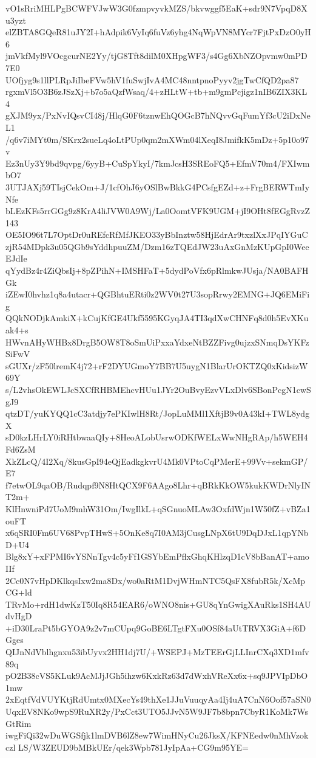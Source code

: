 vO1sRriMHLPgBCWFVJwW3G0fzmpvyvkMZS/bkvwggf5EaK+sdr9N7VpqD8Xu3yzt
elZBTA8GQeR81uJY2I+hAdpik6VyIq6fuVz6yhg4NqWpVN8MYcr7FjtPxDzO0yH6
jmVkfMyl9VOcgcurNE2Yy/tjG8Tft8dilM0XHpgWF3/s4Gg6XbNZOpvmw0mPD7E0
UOfjyg9s1llPLRpJiIbeFVw5hV1fuSwjIvA4MC48nntpnoPyyv2jgTwCfQD2pa87
rgxmVl5O3B6zJSzXj+b7o5aQzfWsaq/4+zHLtW+tb+m9gmPcjigz1nIB6ZIX3KL4
gXJM9yx/PxNvIQsvCI48j/HlqG0F6tznwEhQOGcB7hNQvvGqFumYf3cU2iDxNeL1
/q6v7iMYt0m/SKrx2sueLq4oLtPUp0qm2mXWm04lXeqI8JmifkK5mDz+5p10o97v
Ez3nUy3Y9bd9qvpg/6yyB+CuSpYkyI/7kmJcsH3SREoFQ5+EfmV70m4/FXIwmbO7
3UTJAXj59TIsjCekOm+J/1cfOhJ6yOSlBwBkkG4PCsfgEZd+z+FrgBERWTmIyNfe
bLEzKFs5rrGGg9z8KrA4liJVW0A9Wj/La0OomtVFK9UGM+jI9OHt8fEGgRvzZ143
OE5IO96t7L7OptDr0uREfcRfMfJKEO33yBbInztw58HjEdrAr9txzlXxJPqIYGuC
zjR54MDpk3u05QGb9sYddhpuuZM/Dzm16zTQEdJW23uAxGnMzKUpGpI0WeeEJdIe
qYydBz4r4ZiQbsIj+8pZPihN+IMSHFaT+5dydPoVfx6pRlmkwJUsja/NA0BAFHGk
iZEwI0hvhz1q8a4utacr+QGBhtuERti0z2WV0t27U3sopRrwy2EMNG+JQ6EMiFig
QQkNODjkAmkiX+kCujKfGE4Ukf5595KGyqJA4TI3qdXwCHNFq8d0h5EvXKuak4+s
HWvnAHyWHBx8DrgB5OW8T8oSmUiPxxaYdxeNtBZZFivg0ujzxSNmqDsYKFzSiFwV
sGUXr/zF50lremK4j72+rF2DYUGmoY7BB7U5uygN1BlarUrOKTZQ0xKidsizW69Y
s/L2vhsOkEWLJcSXCfRHBMEhcvHUu1JYr2OuBvyEzvVLxDlv6SBonPcgN1cwSgJ9
qtzDT/yuKYQQ1cC3atdjy7ePKIwlH8Rt/JopLuMMl1XftjB9v0A43kI+TWL8ydgX
sD0kzLHrLY0iRHtbwaaQIy+8HeoALobUsrwODKfWELxWwNHgRAp/h5WEH4Fd6ZsM
XkZLcQ/4I2Xq/8kusGpI94eQjEadkgkvrU4Mk0VPtoCqPMerE+99Vv+sekmGP/E7
f7etwOL9qaOB/Rudqpf9N8HtQCX9F6AAgo8Lhr+qBRkKkOW5kukKWDrNlyINT2m+
KlHnwniPd7UoM9mhW31Om/IwgIlkL+qSGnuoMLAw3OxfdWjn1W50fZ+vBZa1ouFT
x6qSRI0Fm6UV68PvpTHwS+5OnKe8q7I0AM3jCusgLNpX6tU9DqDJxL1qpYNbD+U4
Blg8xY+xFPMI6vYSNnTgv4c5yFf1GSYbEmPflxGhqKHlzqD1cV8bBanAT+amoIIf
2Cc0N7vHpDKlkqsIxw2ma8Dx/wo0aRtM1DvjWHmNTC5QsFX8fubR5k/XcMpCG+ld
TRvMo+rdH1dwKzT50Iq8R54EAR6/oWNO8nis+GU8qYnGwigXAuRks1SH4AUdvHgD
+iD30LraPt5bGYOA9z2v7mCUpq9GoBE6LTgtFXu0OSf84aUtTRVX3GiA+f6DGges
QIJnNdVblhgnxu53ibUyvx2HH1dj7U/+WSEPJ+MzTEErGjLLInrCXq3XD1mfv89q
pO2B38cVS5KLuk9AcMJjJGh5ihzw6KxkRz63d7dWxhVReXx6x+sq9JPVIpDbO1mw
2xEqtfVdVUYKtjRdUmtx0MXecYs49thXe1JJuVuuqyAa4Ij4uA7CnN6Oof57aSN0
UqxEV8NKo9wpS9RuXR2y/PxCct3UTO5JJvN5W9JF7b8bpn7CbyR1KoMk7WsGtRim
iwgFiQi32wDuWGSfjk1lmDVB6lZ8ew7WimHNyCu26JksX/KFNEedw0nMhVzokczl
LS/W3ZEUD9bMBkUEr/qek3Wpb781JyIpAa+CG9m95YE=
